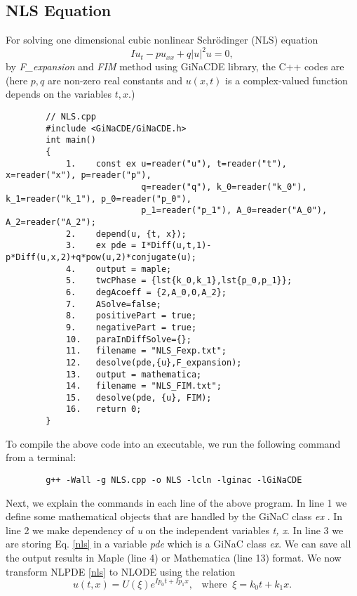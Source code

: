 \documentclass[prd,aps,floats,showkeys,nofootinbib,notitlepage]{revtex4-2}
\begin{document}
	\subsection{NLS Equation}
	For solving one dimensional cubic nonlinear Schrödinger (NLS) equation \cite{nlse}
	\begin{equation}\label{nls}
		Iu_t-pu_{xx}+q{|u|}^2u=0,
	\end{equation}
	by {\em F\_expansion} and {\em FIM} method using GiNaCDE library, the C++ codes are (here $p,q$ are non-zero real constants and $u(x,t)$ is a complex-valued function depends on the variables $t,x$.)\\
	\begin{verbatim}
		// NLS.cpp
		#include <GiNaCDE/GiNaCDE.h>
		int main()
		{
			1.    const ex u=reader("u"), t=reader("t"), x=reader("x"), p=reader("p"), 
			               q=reader("q"), k_0=reader("k_0"), k_1=reader("k_1"), p_0=reader("p_0"),
			               p_1=reader("p_1"), A_0=reader("A_0"), A_2=reader("A_2");   
			2.    depend(u, {t, x});
			3.    ex pde = I*Diff(u,t,1)-p*Diff(u,x,2)+q*pow(u,2)*conjugate(u);
			4.    output = maple;  
			5.    twcPhase = {lst{k_0,k_1},lst{p_0,p_1}};
			6.    degAcoeff = {2,A_0,0,A_2};
			7.    ASolve=false;
			8.    positivePart = true; 
			9.    negativePart = true;
			10.   paraInDiffSolve={};
			11.   filename = "NLS_Fexp.txt";
			12.   desolve(pde,{u},F_expansion);
			13.   output = mathematica;
			14.   filename = "NLS_FIM.txt";
			15.   desolve(pde, {u}, FIM);
			16.   return 0;
		}
	\end{verbatim}
	To compile the above code into an executable, we run the following command from a terminal:
	\begin{verbatim}
		g++ -Wall -g NLS.cpp -o NLS -lcln -lginac -lGiNaCDE
	\end{verbatim}
	Next, we explain the commands in each line of the above program.
	In line 1 we define some mathematical objects that are handled by the GiNaC class {\em ex} \cite{ginac}. In line 2 we make dependency of {\em u} on the independent variables {\em t, x}. In line 3 we are storing Eq. \eqref{nls} in a variable {\em pde} which is a GiNaC class {\em ex}. We can save all the output results in {Maple} (line 4) or {Mathematica} (line 13) format. We now transform NLPDE \eqref{nls} to NLODE using the relation 
	\begin{equation}\label{nls_twtrans}
		u(t,x)=U(\xi)e^{Ip_0t+Ip_1x},\;\;\;\text{where}\;\;\xi=k_0t+k_1x.
	\end{equation}
\end{document}
